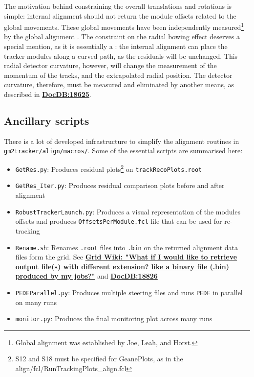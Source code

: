 \documentclass[12pt]{article}
\begin{document}
The motivation behind constraining the overall translations and rotations is simple: internal alignment should not return the module offsets related to the global movements. These global movements have been independently measured\footnote{Global alignment was established by Joe, Leah, and Horst.} by the global alignment \cite{Joe}. The constraint on the radial bowing effect deserves a special mention, as it is essentially a : the internal alignment can place the tracker modules along a curved path, as the residuals will be unchanged. This radial detector curvature, however, will change the measurement of the momentum of the tracks, and the extrapolated radial position. The detector curvature, therefore, must be measured and eliminated by another means, as described in \textbf{\href{https://gm2-docdb.fnal.gov/cgi-bin/private/ShowDocument?docid=18625}{DocDB:18625}}.


\subsection{Ancillary scripts}
There is a lot of developed infrastructure to simplify the alignment routines in \\ \verb!gm2tracker/align/macros/!. Some of the essential scripts are summarised here: 
\begin{itemize}\setlength\itemsep{0.05em}\small
    \item \verb!GetRes.py!: Produces residual plots\footnote{S12 and S18 must be specified for GeanePlots, as in the align/fcl/RunTrackingPlots\_align.fcl} on \verb!trackRecoPlots.root! 
    \item \verb!GetRes_Iter.py!: Produces residual comparison plots before and after alignment 
    \item \verb!RobustTrackerLaunch.py!: Produces a visual representation of the modules offsets and produces \verb!OffsetsPerModule.fcl! file that can be used for re-tracking  
    \item \verb!Rename.sh!: Renames \verb!.root! files into \verb!.bin! on the returned alignment data files form the grid. See \textbf{\href{https://redmine.fnal.gov/redmine/projects/g-2/wiki/Job_Running_Submission_FAQ\#What-if-I-would-like-to-retrieve-output-files-with-different-extension-like-a-binary-file-bin-produced-by-my-jobs}{Grid Wiki: "What if I would like to retrieve output file(s) with different extension? like a binary file (.bin) produced by my jobs?"}} and \textbf{\href{https://gm2-docdb.fnal.gov/cgi-bin/private/ShowDocument?docid=18826}{DocDB:18826}} 
    \item \verb!PEDEParallel.py!: Produces multiple steering files and runs \texttt{PEDE} in parallel on many runs 
       \item \verb!monitor.py!: Produces the final monitoring plot across many runs 
\end{itemize}
\end{document}
